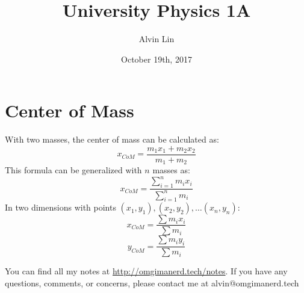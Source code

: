 \documentclass{math}
\title{University Physics 1A}
\author{Alvin Lin}
\date{October 19th, 2017}
\begin{document}
\maketitle

\section*{Center of Mass}
With two masses, the center of mass can be calculated as:
\[ x_{CoM} = \frac{m_1x_1+m_2x_2}{m_1+m_2} \]
This formula can be generalized with \( n \) masses as:
\[ x_{CoM} = \frac{\sum_{i=1}^{n}m_ix_i}{\sum_{i=1}^{n}m_i} \]
In two dimensions with points \( (x_1,y_1),(x_2,y_2),\dots(x_n,y_n) \):
\[ x_{CoM} = \frac{\sum m_ix_i}{\sum m_i} \]
\[ y_{CoM} = \frac{\sum m_iy_i}{\sum m_i} \]

\begin{center}
  You can find all my notes at \url{http://omgimanerd.tech/notes}. If you have
  any questions, comments, or concerns, please contact me at
  alvin@omgimanerd.tech
\end{center}
\end{document}
